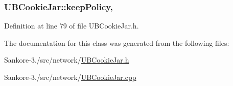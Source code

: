 \hypertarget{class_u_b_cookie_jar_a89c86e4b360b184c0ffd6f00e49c0458}{
\subsubsection[{keep\-Policy}]{ U\-B\-Cookie\-Jar\-::keep\-Policy\hspace{0.3cm}{\ttfamily [read]}, {\ttfamily [write]}}}\label{dd/d20/class_u_b_cookie_jar_a89c86e4b360b184c0ffd6f00e49c0458}


Definition at line 79 of file U\-B\-Cookie\-Jar.\-h.



The documentation for this class was generated from the following files\-:\begin{DoxyCompactItemize}
\item 
Sankore-\/3./src/network/\hyperlink{_u_b_cookie_jar_8h}{U\-B\-Cookie\-Jar.\-h}\item 
Sankore-\/3./src/network/\hyperlink{_u_b_cookie_jar_8cpp}{U\-B\-Cookie\-Jar.\-cpp}\end{DoxyCompactItemize}
